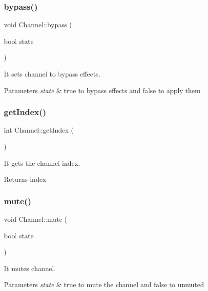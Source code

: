 \subsubsection{bypass()}
{\footnotesize\ttfamily void Channel\+::bypass (\begin{DoxyParamCaption}\item[{bool}]{state }\end{DoxyParamCaption})}



It sets channel to bypass effects. 


\begin{DoxyParams}{Parameters}
{\em state} & true to bypass effects and false to apply them \\
\hline
\end{DoxyParams}
\mbox{\label{class_channel_af0427a10e1713ba8327df0b0cd0fb2f5}} 
\subsubsection{get\+Index()}
{\footnotesize\ttfamily int Channel\+::get\+Index (\begin{DoxyParamCaption}{ }\end{DoxyParamCaption})}



It gets the channel index. 

\begin{DoxyReturn}{Returns}
index 
\end{DoxyReturn}
\mbox{\label{class_channel_a88f542e0f6d1e1d384ad8bf79a9e305b}} 
\subsubsection{mute()}
{\footnotesize\ttfamily void Channel\+::mute (\begin{DoxyParamCaption}\item[{bool}]{state }\end{DoxyParamCaption})}



It mutes channel. 


\begin{DoxyParams}{Parameters}
{\em state} & true to mute the channel and false to unmuted \\
\hline
\end{DoxyParams}
\mbox{\label{class_channel_a21286e2c4add83ea96e2636e87e9871b}} 
